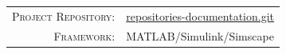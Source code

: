 \documentclass[12pt,a4paper,oneside]{book}
\newcommand{\MetaLabelA}{Project Repository}
\newcommand{\MetaValueAUrl}{https://github.com/pwr-control/repositories-documentation.git}
\newcommand{\MetaValueALabel}{repositories-documentation.git}
\newcommand{\MetaLabelB}{Framework}
\newcommand{\MetaValueB}{MATLAB/Simulink/Simscape}
\newcommand{\MetaLabelC}{Architecture}
\newcommand{\MetaValueC}{SiC, EiceDRIVER, Customized Power Supplies}
\begin{document}
	\vfill
	
	\noindent
	\begin{tabular}{@{} r @{\quad} l @{}}
		\textsc{\MetaLabelA:} & {\href{\MetaValueAUrl}{\MetaValueALabel}} \\[3pt]
		\textsc{\MetaLabelB:} & {\MetaValueB}       \\[3pt]
	\end{tabular}
	
	\newpage
	\setcounter{page}{1}
	\tableofcontents
	\listoffigures	
	\listoftables
	\newpage
	
\end{document}
